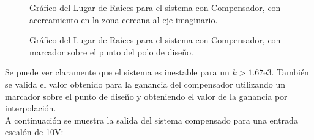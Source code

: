 \documentclass[a4paper,11pt]{article}
\begin{document}
	  \begin{figure}[H] %
	\caption{Gráfico del Lugar de Raíces para el sistema con Compensador, con acercamiento en la zona cercana al eje imaginario.}
	\label{fig:FTlazoa_comp_rlocus_kinest}
	\end{figure} 

\begin{figure}[H] %
	\caption{Gráfico del Lugar de Raíces para el sistema con Compensador, con marcador sobre el punto del polo de diseño.}
	\label{fig:FTlazoa_comp_rlocus_zoom_kcomp}
\end{figure} 

Se puede ver claramente que el sistema es inestable para un $k>1.67\text{e}3$. También se valida el valor obtenido para la ganancia del compensador utilizando un marcador sobre el punto de diseño y obteniendo el valor de la ganancia por interpolación.\\
A continuación se muestra la salida del sistema compensado para una entrada escalón de 10V:	
	
\end{document}
